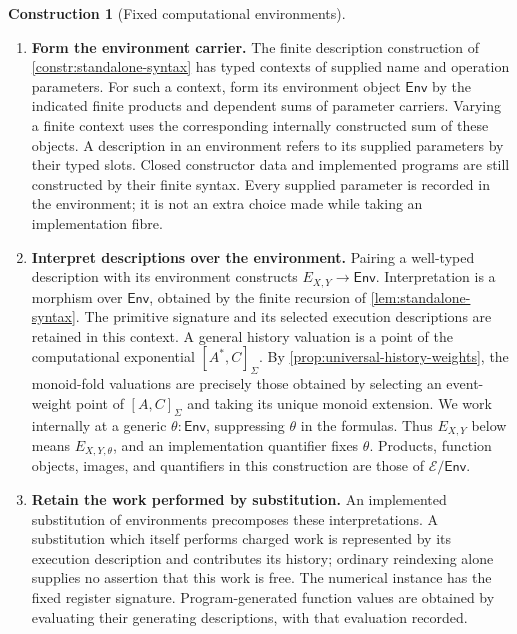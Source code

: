 \documentclass[11pt,a4paper]{article}
\numberwithin{algorithm}{section}
\numberwithin{equation}{section}
\theoremstyle{definition}
\theoremstyle{remark}
\theoremstyle{plain}
\newcommand{\E}{\mathcal E}
\newcommand{\Env}{\mathsf{Env}}
\theoremstyle{definition}
\newtheorem{construction}[construction]{Construction}
\theoremstyle{plain}
\begin{document}
\begin{construction}[Fixed computational environments]
\label{constr:fixed-environment}\leavevmode
\begin{enumerate}[leftmargin=*,align=left]
\item \textbf{Form the environment carrier.}
The finite description construction of \cref{constr:standalone-syntax} has typed contexts
of supplied name and operation parameters. For such a context, form
its environment object $\Env$ by the indicated finite products and
dependent sums of parameter carriers. Varying a finite context uses
the corresponding internally constructed sum of these objects. A
description in an environment refers to its supplied parameters by
their typed slots. Closed constructor data and implemented programs
are still constructed by their finite syntax. Every supplied
parameter is recorded in the environment; it is not an extra choice made
while taking an implementation fibre.

\item \textbf{Interpret descriptions over the environment.}
Pairing a well-typed description with its environment constructs
$E_{X,Y}\to\Env$. Interpretation is a morphism over $\Env$, obtained
by the finite recursion of \cref{lem:standalone-syntax}. The primitive signature and its selected execution descriptions
are retained in this context. A general history valuation is a point
of the computational exponential $[A^*,C]_\Sigma$. By
\cref{prop:universal-history-weights}, the monoid-fold valuations
are precisely those obtained by selecting an event-weight point of
$[A,C]_\Sigma$ and taking its unique monoid extension. We work internally at a generic
$\theta:\Env$, suppressing $\theta$ in the formulas. Thus $E_{X,Y}$
below means $E_{X,Y,\theta}$, and an implementation quantifier fixes
$\theta$. Products, function objects, images, and quantifiers in this
construction are those of $\E/\Env$.

\item \textbf{Retain the work performed by substitution.}
An implemented substitution of environments precomposes these
interpretations. A substitution which itself performs charged work is
represented by its execution description and contributes its history;
ordinary reindexing alone supplies no assertion that this work is free.
The numerical instance has the fixed register signature.
Program-generated function values are obtained by evaluating
their generating descriptions, with that evaluation recorded.
\end{enumerate}
\end{construction}
\end{document}
